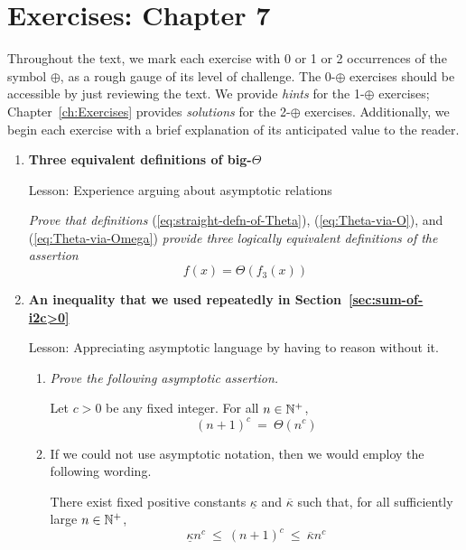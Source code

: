 
\section{Exercises: Chapter 7}

Throughout the text, we mark each exercise with 0 or 1 or 2 occurrences of the symbol $\oplus$, as a rough gauge of its level of challenge.  The 0-$\oplus$ exercises should be accessible by just
reviewing the text.  We provide {\em hints} for the 1-$\oplus$ exercises; Chapter~\ref{ch:Exercises} provides {\em solutions} for the 2-$\oplus$ exercises.  Additionally, we begin each exercise with a brief explanation of its anticipated value to the reader.

\begin{enumerate}
\item
{\bf Three equivalent definitions of big-$\Theta$}

{\sc Lesson:} Experience arguing about asymptotic relations

\smallskip

{\em Prove that definitions} (\ref{eq:straight-defn-of-Theta}), (\ref{eq:Theta-via-O}), and (\ref{eq:Theta-via-Omega}) {\em provide three logically equivalent definitions of the assertion}
\[  f(x) = \Theta(f_3(x)) \]

\medskip\item
{\bf An inequality that we used repeatedly in Section~\ref{sec:sum-of-i2c>0}}

{\sc Lesson:} Appreciating asymptotic language by having to reason without it.

  \begin{enumerate}
  \item
{\em Prove the following asymptotic assertion.}

\begin{prop}
\label{thm:poly-w-asymp}
Let $c > 0$ be any fixed integer.  For all $n \in \mathbb{N}^+$,
\[ (n+1)^c \ = \ \Theta(n^c) \]
\end{prop}

  \medskip\item
If we could not use asymptotic notation, then we would employ the following wording.

\begin{prop}
\label{thm:poly-wo-asymp}
There exist fixed positive constants $\underline{\kappa}$ and $\overline{\kappa}$ such that, for all sufficiently large $n \in \mathbb{N}^+$,
\[ \underline{\kappa} n^c \ \leq \ (n+1)^c \ \leq \ \overline{\kappa} n^c \]
\end{prop}


\end{enumerate}
\end{enumerate}
